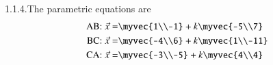 \documentclass[journal,12pt,twocolumn]{IEEEtran}
\begin{document}



\vspace{3cm}

1.1.4.The parametric equations are
\begin{align}
\text{AB: } \vec{x} = &\myvec{1\\-1} + k \myvec{-5\\7}\\
\text{BC: } \vec{x} = &\myvec{-4\\6} + k \myvec{1\\-11}\\
\text{CA: } \vec{x} = &\myvec{-3\\-5} + k \myvec{4\\4} 
\end{align}
\end{document}
